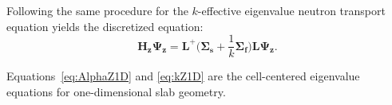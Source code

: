 Following the same procedure for the $k$-effective eigenvalue neutron transport equation yields the discretized equation:
\begin{equation}
	\boxed{\mathbf{H_{z}} \mathbf{\Psi_{z}} = \mathbf{L}^{+} \bigg ( \mathbf{\Sigma_{s}} + \frac{1}{k}\mathbf{\Sigma_{f}} \bigg ) \mathbf{L} \mathbf{\Psi_{z}}.}
	\label{eq:kZ1D}
\end{equation}

Equations~\ref{eq:AlphaZ1D} and \ref{eq:kZ1D} are the cell-centered eigenvalue equations for one-dimensional slab geometry.